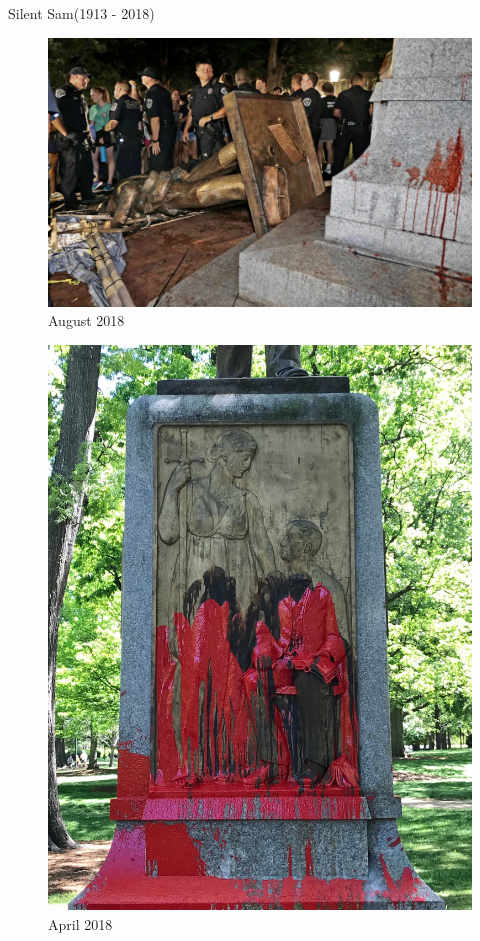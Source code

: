 \documentclass[10pt]{beamer}
\begin{document}
\begin{frame}{Silent Sam(1913 - 2018)}
    \begin{minipage}{0.5\textwidth}
    \begin{figure}
        \includegraphics[scale = 0.3]{photos/photo6.jpg}
        \caption{August 2018}
    \end{figure}
    \end{minipage}
    \begin{minipage}{0.4\textwidth}
    \begin{figure}
        \includegraphics[scale = 0.09]{photos/photo7.JPG}
        \caption{April 2018}
    \end{figure}
    \end{minipage}
\end{frame}
\end{document}
